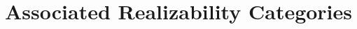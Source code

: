 \documentclass[11pt]{article}
\newtheorem{defn}[thrm]{Definition}
\begin{document}
%

\section{Associated Realizability Categories}%
\label{sec:realizability-categories}
\end{document}
